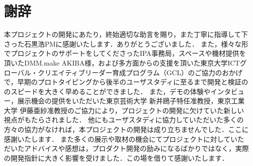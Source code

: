 \section{謝辞}
本プロジェクトの開発にあたり，終始適切な助言を賜り，また丁寧に指導して下さった石黒浩PMに感謝いたします．ありがとうございました．
また，様々な形でプロジェクトのサポートをしてくださったIPA事務局，スペースや機材提供を頂いたDMM.make AKIBA様，および多方面からの支援を頂いた東京大学ICTグローバル・クリエイティブリーダー育成プログラム（GCL）のご協力のおかげで，早期のプロトタイピングから後半のユーザスタディに至るまで開発と検証ののスピードを大きく早めることができました．
また，デモの体験やインタビュー，展示機会の提供をいただいた東京芸術大学 新井鴎子特任准教授，東京工業大学 伊藤亜紗准教授のご協力により，プロジェクトの開発に欠けていた新しい視点がもたらされました．
他にもユーザスタディに協力していただいた多くの方々の協力がなければ，本プロジェクトの開発は成り立ちませんでした．ここに感謝いたします．
また多くの展示や取材の機会にてプロジェクトに対していただいたアドバイスや感想は，プロダクト開発の励みになるばかりではなく，実際の開発指針に大きく影響を受けました．この場を借りて感謝いたします．

